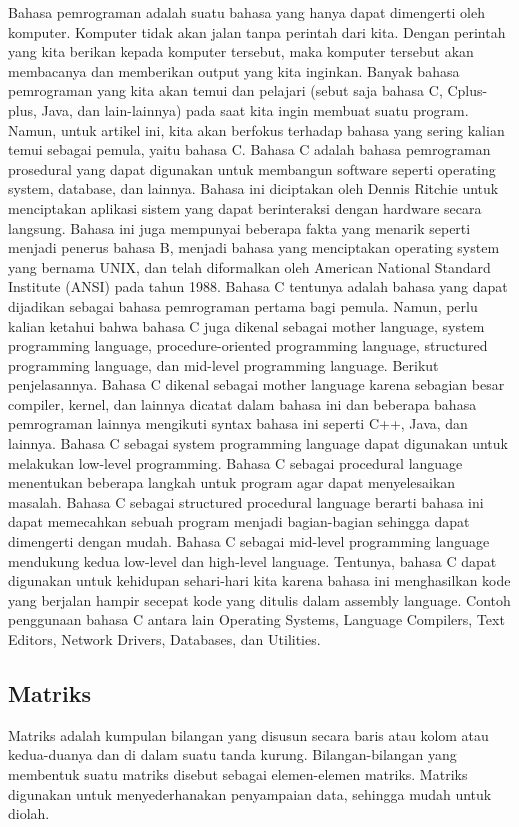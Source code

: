 \documentclass[conference]{IEEEtran}
\begin{document}
Bahasa pemrograman adalah suatu bahasa yang hanya dapat dimengerti oleh komputer.
 Komputer tidak akan jalan tanpa perintah dari kita. Dengan perintah yang kita 
 berikan kepada komputer tersebut, maka komputer tersebut akan membacanya dan 
 memberikan output yang kita inginkan. Banyak bahasa pemrograman yang kita akan 
 temui dan pelajari (sebut saja bahasa C, Cplus-plus, Java, dan lain-lainnya) pada 
 saat kita ingin membuat suatu program. Namun, untuk artikel ini, kita akan berfokus
  terhadap bahasa yang sering kalian temui sebagai pemula, yaitu bahasa C.
Bahasa C adalah bahasa pemrograman prosedural yang dapat digunakan untuk 
membangun software seperti operating system, database, dan lainnya. Bahasa ini 
diciptakan oleh Dennis Ritchie untuk menciptakan aplikasi sistem yang dapat berinteraksi 
dengan hardware secara langsung. Bahasa ini juga mempunyai beberapa fakta yang menarik 
seperti menjadi penerus bahasa B, menjadi bahasa yang menciptakan operating system yang
 bernama UNIX, dan telah diformalkan oleh American National Standard Institute (ANSI) pada tahun 1988.
Bahasa C tentunya adalah bahasa yang dapat dijadikan sebagai bahasa pemrograman
 pertama bagi pemula. Namun, perlu kalian ketahui bahwa bahasa C juga dikenal sebagai 
 mother language, system programming language, procedure-oriented programming language, 
 structured programming language, dan mid-level programming language. Berikut penjelasannya.
Bahasa C dikenal sebagai mother language karena sebagian besar compiler, kernel,
 dan lainnya dicatat dalam bahasa ini dan beberapa bahasa pemrograman lainnya 
 mengikuti syntax bahasa ini seperti C++, Java, dan lainnya. Bahasa C sebagai system 
 programming language dapat digunakan untuk melakukan low-level programming. 
 Bahasa C sebagai procedural language menentukan beberapa langkah untuk program 
 agar dapat menyelesaikan masalah. Bahasa C sebagai structured procedural language 
 berarti bahasa ini dapat memecahkan sebuah program menjadi bagian-bagian sehingga
  dapat dimengerti dengan mudah. Bahasa C sebagai mid-level programming language 
  mendukung kedua low-level dan high-level language.
Tentunya, bahasa C dapat digunakan untuk kehidupan sehari-hari kita karena 
bahasa ini menghasilkan kode yang berjalan hampir secepat kode yang ditulis dalam assembly language. Contoh penggunaan bahasa C antara lain Operating Systems, Language Compilers, Text Editors, Network Drivers, Databases, dan Utilities.

\subsection{Matriks}
Matriks adalah kumpulan bilangan yang disusun secara baris atau kolom atau kedua-duanya dan di dalam suatu tanda kurung. Bilangan-bilangan yang membentuk suatu matriks disebut sebagai elemen-elemen matriks. Matriks digunakan untuk menyederhanakan penyampaian data, sehingga mudah untuk diolah.
\end{document}
